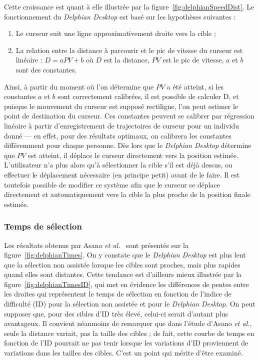 \begin{appendices}
	Cette croissance est quant à elle illustrée par la figure~\ref{fig:delphianSpeedDist}. Le fonctionnement du \emph{Delphian Desktop} est basé sur les hypothèses suivantes :
	
	\begin{enumerate}
		\item Le curseur suit une ligne approximativement droite vers la cible ;
		\item La relation entre la distance à parcourir et le pic de vitesse du curseur est linéaire : $D = aPV + b$ où $D$ est la distance, $PV$ est le pic de vitesse, $a$ et $b$ sont des constantes.
	\end{enumerate}
	
	Ainsi, à partir du moment où l'on détermine que $PV$ a été atteint, si les constantes $a$ et $b$ sont correctement calibrées, il est possible de calculer D, et puisque le mouvement du curseur est supposé rectiligne, l'on peut estimer le point de destination du curseur. Ces constantes peuvent se calibrer par régression linéaire à partir d'enregistrement de trajectoires de curseur pour un individu donné --- en effet, pour des résultats optimaux, on calibrera les constantes différemment pour chaque personne. Dès lors que le \emph{Delphian Desktop} détermine que $PV$ est atteint, il déplace le curseur directement vers la position estimée. L'utilisateur n'a plus alors qu'à sélectionner la cible s'il est déjà dessus, ou effectuer le déplacement nécessaire (en principe petit) avant de le faire. Il est toutefois possible de modifier ce système afin que le curseur se déplace directement et automatiquement vers la cible la plus proche de la position finale estimée.
	
	\subsubsection{Temps de sélection}
	Les résultats obtenus par Asano \emph{et al.}~\cite{asano2005predictive} sont présentés sur la figure~\ref{fig:delphianTimes}. On y constate que le \emph{Delphian Desktop} est plus lent que la sélection non assistée lorsque les cibles sont proches, mais plus rapides quand elles sont distantes. Cette tendance est d'ailleurs mieux illustrée par la figure~\ref{fig:delphianTimesID}, qui met en évidence les différences de pentes entre les droites qui représentent le temps de sélection en fonction de l'indice de difficulté (ID) pour la sélection non assistée et pour le \emph{Delphian Desktop}. On peut supposer que, pour des cibles d'ID très élevé, celui-ci serait d'autant plus avantageux. Il convient néanmoins de remarquer que dans l'étude d'Asano \emph{et al.}, seule la distance variait, pas la taille des cibles ; de fait, cette courbe de temps en fonction de l'ID pourrait ne pas tenir lorsque les variations d'ID proviennent de variations dans les tailles des cibles. C'est un point qui mérite d'être examiné.
	

\end{appendices}
